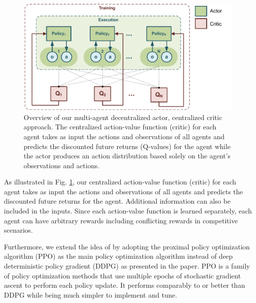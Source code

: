 %
\begin{figure}[h!]
\includegraphics[scale=.65]{images/MAPPO}
%
%
\caption{Overview of our multi-agent decentralized actor, centralized critic approach. The centralized action-value function (critic) for each agent takes as input the actions and observations of all agents and predicts the discounted future returns (Q-values) for the agent while the actor produces an action distribution based solely on the agent's observations and actions.}
\label{fig:MAPPO}       %
\end{figure}

As illustrated in Fig. \ref{fig:MAPPO}, our centralized action-value function (critic) for each agent takes as input the actions and observations of all agents and predicts the discounted future returns for the agent. Additional information can also be included in the inputs. Since each action-value function is learned separately, each agent can have arbitrary rewards including conflicting rewards in competitive scenarios.

Furthermore, we extend the idea of \cite{schulman2017proximal} by adopting the proximal policy optimization algorithm (PPO) as the main policy optimization algorithm instead of deep deterministic policy gradient (DDPG) as presented in the paper. PPO is a family of policy optimization methods that use multiple epochs of stochastic gradient ascent to perform each policy update. It performs comparably to or better than DDPG while being much simpler to implement and tune.

